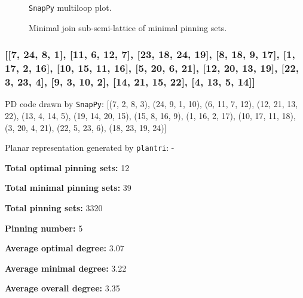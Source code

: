 \documentclass{article}%
\begin{document}
\begin{multicols}{2}
\begin{figure}[H]
\centering

\caption{\texttt{SnapPy} multiloop plot.}
\label{fig:tex/img/[[10, 24, 1, 11], [11, 6, 12, 5], [9, 17, 10, 18], [23, 16, 24, 17], [1, 16, 2, 15], [6, 21, 7, 20], [12, 20, 13, 19], [4, 18, 5, 19], [8, 3, 9, 4], [22, 2, 23, 3], [14, 21, 15, 22], [7, 14, 8, 13]].svg}
\end{figure}
\columnbreak

\begin{figure}[H]
\centering
\scalebox{0.8}{}
\caption{Minimal join sub-semi-lattice of minimal pinning sets.}
\label{fig:tex/img/[[10, 24, 1, 11], [11, 6, 12, 5], [9, 17, 10, 18], [23, 16, 24, 17], [1, 16, 2, 15], [6, 21, 7, 20], [12, 20, 13, 19], [4, 18, 5, 19], [8, 3, 9, 4], [22, 2, 23, 3], [14, 21, 15, 22], [7, 14, 8, 13]].pgf}
\end{figure}
\end{multicols}

\newpage

\subsubsection{[[7, 24, 8, 1], [11, 6, 12, 7], [23, 18, 24, 19], [8, 18, 9, 17], [1, 17, 2, 16], [10, 15, 11, 16], [5, 20, 6, 21], [12, 20, 13, 19], [22, 3, 23, 4], [9, 3, 10, 2], [14, 21, 15, 22], [4, 13, 5, 14]]}

{\small\noindent PD code drawn by \texttt{SnapPy}: [(7, 2, 8, 3), (24, 9, 1, 10), (6, 11, 7, 12), (12, 21, 13, 22), (13, 4, 14, 5), (19, 14, 20, 15), (15, 8, 16, 9), (1, 16, 2, 17), (10, 17, 11, 18), (3, 20, 4, 21), (22, 5, 23, 6), (18, 23, 19, 24)]}

{\small\noindent Planar representation generated by \texttt{plantri}: -}

\begin{multicols}{2}
{\normalsize \noindent\textbf{Total optimal pinning sets:} 12

\noindent\textbf{Total minimal pinning sets:} 39

\noindent\textbf{Total pinning sets:} 3320

\noindent\textbf{Pinning number:} 5

}
\columnbreak

{\normalsize \noindent\textbf{Average optimal degree:} 3.07

\noindent\textbf{Average minimal degree:} 3.22

\noindent\textbf{Average overall degree:} 3.35

}
\end{multicols}
\end{document}
